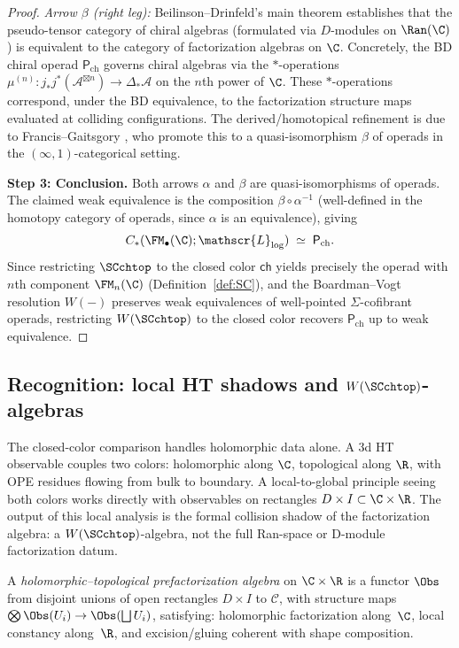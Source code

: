 \begin{proof}
\emph{Arrow $\beta$ (right leg):} Beilinson--Drinfeld's main theorem \cite[{\S}4.5.3]{BD04} establishes that the pseudo-tensor category of chiral algebras (formulated via $D$-modules on $\Ran(\C)$) is equivalent to the category of factorization algebras on $\C$. Concretely, the BD chiral operad $\mathsf{P}_{\mathrm{ch}}$ governs chiral algebras via the $\ast$-operations $\mu^{(n)}\colon j_\ast j^\ast(\mathcal{A}^{\boxtimes n}) \to \Delta_\ast \mathcal{A}$ on the $n$th power of $\C$. These $\ast$-operations correspond, under the BD equivalence, to the factorization structure maps evaluated at colliding configurations. The derived/homotopical refinement is due to Francis--Gaitsgory \cite[Theorem~5.1]{FG12}, who promote this to a quasi-isomorphism $\beta$ of operads in the $(\infty,1)$-categorical setting.

\medskip\noindent
\textbf{Step 3: Conclusion.}
Both arrows $\alpha$ and $\beta$ are quasi-isomorphisms of operads. The claimed weak equivalence is the composition $\beta \circ \alpha^{-1}$ (well-defined in the homotopy category of operads, since $\alpha$ is an equivalence), giving
\[
C_\ast(\FM_\bullet(\C);\mathscr{L}_{\log}) \;\simeq\; \mathsf{P}_{\mathrm{ch}}.
\]
Since restricting $\SCchtop$ to the closed color $\mathsf{ch}$ yields precisely the operad with $n$th component $\FM_n(\C)$ (Definition~\ref{def:SC}), and the Boardman--Vogt resolution $W(-)$ preserves weak equivalences of well-pointed $\Sigma$-cofibrant operads, restricting $W(\SCchtop)$ to the closed color recovers $\mathsf{P}_{\mathrm{ch}}$ up to weak equivalence.
\end{proof}

\subsection{Recognition: local HT shadows and $W(\SCchtop)$-algebras}
\label{subsec:SC-vs-prefactorization}

The closed-color comparison handles holomorphic data alone. A
3d HT observable couples two colors: holomorphic along
$\C$, topological along $\R$, with OPE residues flowing from bulk
to boundary. A local-to-global principle seeing both colors works
directly with observables on rectangles
$D \times I \subset \C \times \R$. The output of this local analysis
is the formal collision shadow of the factorization algebra: a
$W(\SCchtop)$-algebra, not the full Ran-space or D-module
factorization datum.

\begin{definition}[HT prefactorization]
\label{def:prefact}
A \emph{holomorphic--topological prefactorization algebra} on $\C\times\R$ is a functor $\Obs$ from disjoint unions of open rectangles $D\times I$ to $\mathcal C$, with structure maps $\bigotimes\Obs(U_i)\to \Obs(\bigsqcup U_i)$, satisfying: holomorphic factorization along~$\C$, local constancy along~$\R$, and excision/gluing coherent with shape composition.
\end{definition}

